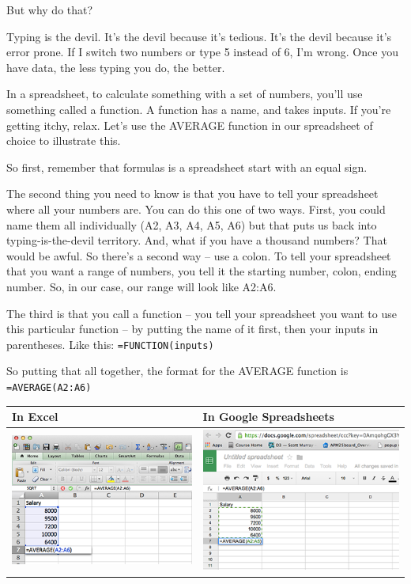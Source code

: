 \documentclass[
]{book}
\begin{document}
But why do that?

Typing is the devil. It's the devil because it's tedious. It's the devil because it's error prone. If I switch two numbers or type 5 instead of 6, I'm wrong. Once you have data, the less typing you do, the better.

In a spreadsheet, to calculate something with a set of numbers, you'll use something called a function. A function has a name, and takes inputs. If you're getting itchy, relax. Let's use the AVERAGE function in our spreadsheet of choice to illustrate this.

So first, remember that formulas is a spreadsheet start with an equal sign.

The second thing you need to know is that you have to tell your spreadsheet where all your numbers are. You can do this one of two ways. First, you could name them all individually (A2, A3, A4, A5, A6) but that puts us back into typing-is-the-devil territory. And, what if you have a thousand numbers? That would be awful. So there's a second way -- use a colon. To tell your spreadsheet that you want a range of numbers, you tell it the starting number, colon, ending number. So, in our case, our range will look like A2:A6.

The third is that you call a function -- you tell your spreadsheet you want to use this particular function -- by putting the name of it first, then your inputs in parentheses. Like this: \texttt{=FUNCTION(inputs)}

So putting that all together, the format for the AVERAGE function is \texttt{=AVERAGE(A2:A6)}

\begin{longtable}[]{@{}ll@{}}
\toprule
In Excel & In Google Spreadsheets \\
\midrule
\endhead
\includegraphics{images/excelmean2.png} & \includegraphics{images/googlemean2.png} \\
\bottomrule
\end{longtable}
\end{document}
